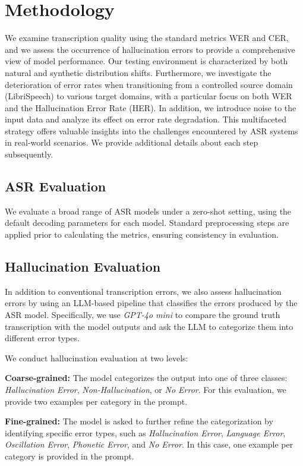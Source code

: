 \section{Methodology}\label{sec:methodology}

We examine transcription quality using the standard metrics WER and CER, and we assess the occurrence of hallucination errors to provide a comprehensive view of model performance. Our testing environment is characterized by both natural and synthetic distribution shifts. Furthermore, we investigate the deterioration of error rates when transitioning from a controlled source domain (LibriSpeech) to various target domains, with a particular focus on both WER and the Hallucination Error Rate (HER). In addition, we introduce noise to the input data and analyze its effect on error rate degradation. This multifaceted strategy offers valuable insights into the challenges encountered by ASR systems in real-world scenarios. We provide additional details about each step subsequently.

\subsection{ASR Evaluation}
We evaluate a broad range of ASR models under a zero-shot setting, using the default decoding parameters for each model. Standard preprocessing steps are applied prior to calculating the metrics, ensuring consistency in evaluation. 

\subsection{Hallucination Evaluation}\label{subsec:hallucination_evaluation}
In addition to conventional transcription errors, we also assess hallucination errors by using an LLM-based pipeline that classifies the errors produced by the ASR model. Specifically, we use \emph{GPT-4o mini} to compare the ground truth transcription with the model outputs and ask the LLM to categorize them into different error types.

We conduct hallucination evaluation at two levels:

\noindent\textbf{Coarse-grained:} The model categorizes the output into one of three classes: \textit{Hallucination Error}, \textit{Non-Hallucination}, or \textit{No Error}. For this evaluation, we provide two examples per category in the prompt.

\noindent\textbf{Fine-grained:} The model is asked to further refine the categorization by identifying specific error types, such as \textit{Hallucination Error}, \textit{Language Error}, \textit{Oscillation Error}, \textit{Phonetic Error}, and \textit{No Error}. In this case, one example per category is provided in the prompt. 

